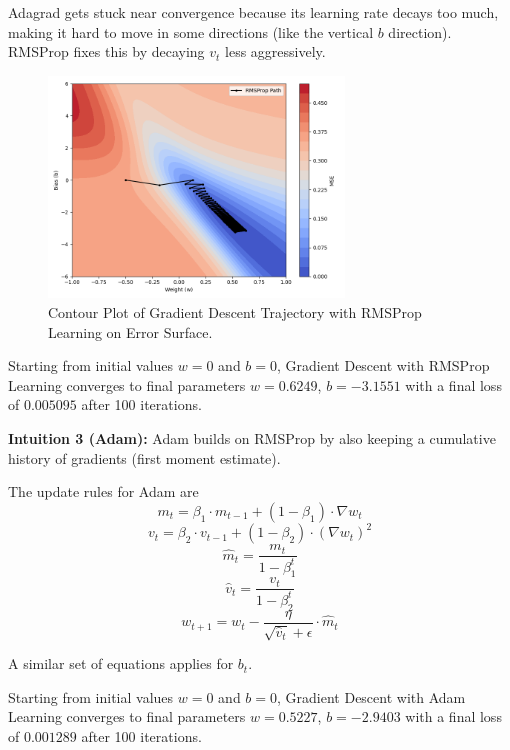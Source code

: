 Adagrad gets stuck near convergence because its learning rate decays too much, making it hard to move in some directions (like the vertical \( b \) direction). RMSProp fixes this by decaying \( v_t \) less aggressively.

\begin{figure}[h!]
    \centering
    \includegraphics[width=0.7\textwidth]{content/section01/chapter01/figs/rmsprop_gd_contour.png}
    \caption{Contour Plot of Gradient Descent Trajectory with RMSProp Learning on Error Surface.}
\end{figure}

Starting from initial values \( w = 0 \) and \( b = 0 \), Gradient Descent with RMSProp Learning converges to final parameters \( w = 0.6249 \), \( b = -3.1551 \) with a final loss of \( 0.005095 \) after 100 iterations.

\textbf{Intuition 3 (Adam):} Adam builds on RMSProp by also keeping a cumulative history of gradients (first moment estimate).

The update rules for Adam are
\[
m_t = \beta_1 \cdot m_{t-1} + (1 - \beta_1) \cdot \nabla w_t
\]
\[
v_t = \beta_2 \cdot v_{t-1} + (1 - \beta_2) \cdot (\nabla w_t)^2
\]
\[
\hat{m}_t = \frac{m_t}{1 - \beta_1^t}
\]
\[
\hat{v}_t = \frac{v_t}{1 - \beta_2^t}
\]
\[
w_{t+1} = w_t - \frac{\eta}{\sqrt{\hat{v}_t} + \epsilon} \cdot \hat{m}_t
\]

A similar set of equations applies for \( b_t \).

Starting from initial values \( w = 0 \) and \( b = 0 \), Gradient Descent with Adam Learning converges to final parameters \( w = 0.5227 \), \( b = -2.9403 \) with a final loss of \( 0.001289 \) after 100 iterations.

